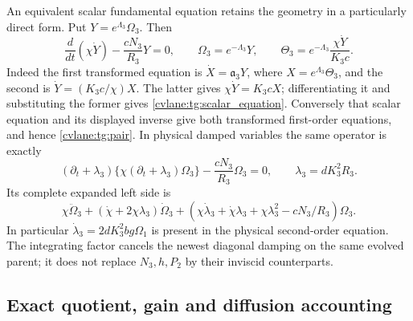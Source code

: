 An equivalent scalar fundamental equation retains the geometry in a
particularly direct form. Put $Y=e^{\Lambda_3}\Omega_3$. Then
\begin{equation}\label{cvlane:tg:scalar_equation}
 \frac d{dt}(\chi\dot Y)-\frac{cN_3}{R_3}Y=0,
 \qquad
 \Omega_3=e^{-\Lambda_3}Y,\qquad
 \Theta_3=e^{-\Lambda_3}\frac{\chi\dot Y}{K_3c}.
\end{equation}
Indeed the first transformed equation is
$\dot X=\mathfrak a_3Y$, where $X=e^{\Lambda_3}\Theta_3$,
and the second is $\dot Y=(K_3c/\chi)X$. The latter gives
$\chi\dot Y=K_3cX$; differentiating it and substituting the former
gives \eqref{cvlane:tg:scalar_equation}. Conversely that scalar equation
and its displayed inverse give both transformed first-order equations,
and hence \eqref{cvlane:tg:pair}. In physical damped variables the same
operator is exactly
\begin{equation}\label{cvlane:tg:damped_scalar}
 (\partial_t+\lambda_3)
       \{\chi(\partial_t+\lambda_3)\Omega_3\}
       -\frac{cN_3}{R_3}\Omega_3=0,
 \qquad \lambda_3=dK_3^2R_3.
\end{equation}
Its complete expanded left side is
\[
 \chi\ddot\Omega_3+(\dot\chi+2\chi\lambda_3)\dot\Omega_3+
 (\chi\dot\lambda_3+\dot\chi\lambda_3+\chi\lambda_3^2-cN_3/R_3)\Omega_3.
\]
In particular $\dot\lambda_3=2dK_3^2bg\Omega_1$ is present in
the physical second-order equation. The integrating factor cancels
the newest diagonal damping on the same evolved parent; it does not
replace $N_3,h,P_2$ by their inviscid counterparts.

\subsection{Exact quotient, gain and diffusion accounting}

